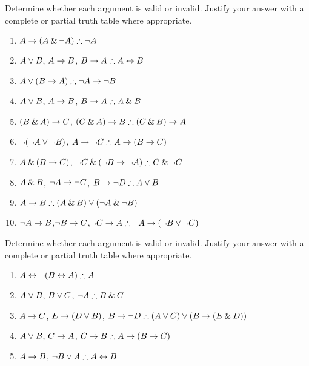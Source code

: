 \noindent\problempart Determine whether each argument is valid or invalid. Justify your answer with a complete or partial truth table where appropriate.
\label{pr.TT.valid5} 
\begin{enumerate}
\item $A\eif(A\eand\enot A)\therefore \enot A$ \hfill {}
\item $A \vee B$, $A \rightarrow B$, $B \eif A \therefore  A \eiff B$  \hfill {}
\item $A\eor(B\eif A)\therefore \enot A \eif \enot B$ \hfill {}
\item $A \vee B$, $A \rightarrow B$, $ B \eif A \therefore  A \eand B$ \hfill {}
\item $(B\mathbin{\&} A)\rightarrow C$, $(C\eand A)\eif B\therefore (C\eand B)\eif A$ \hfill {}
\item $\neg (\neg A \vee \neg B)$, $A \eif \enot C \therefore  A \eif (B \eif C)$ \hfill {}
\item $A \mathbin{\&} (B \rightarrow C)$, $\enot C \eand (\enot B \eif \enot A)\therefore C \eand \enot C$ \hfill {}
\item $A \mathbin{\&} B$, $\neg A \rightarrow \neg C$, $B \eif \enot D \therefore  A \eor B$ \hfill {}
\item $A \eif B\therefore (A \eand B) \eor (\enot A \eand \enot B)$ \hfill {}
\item $\neg A \rightarrow B$,$ \neg B \rightarrow C $,$ \enot C \eif A \therefore  \enot A \eif (\enot B \eor \enot C)$ \hfill {}

\end{enumerate}

\noindent\problempart Determine whether each argument is valid or invalid. Justify your answer with a complete or partial truth table where appropriate.
\label{pr.TT.valid6} 
\begin{enumerate}
\item $A\eiff\enot(B\eiff A)\therefore A$ \hfill {}
\item $A\vee B$, $B\vee C$, $\enot A\therefore B \eand C$ \hfill {}
\item $A \rightarrow C$, $E \rightarrow (D \vee B)$, $B \eif \enot D\therefore (A \eor C) \eor (B \eif (E \eand D))$ \hfill {}
\item $A \vee B$, $C \rightarrow A$, $C \eif B\therefore A \eif (B \eif C)$ \hfill {}
\item $A \rightarrow B$, $\enot B \eor A\therefore A \eiff B$ \hfill {}
\end{enumerate}

